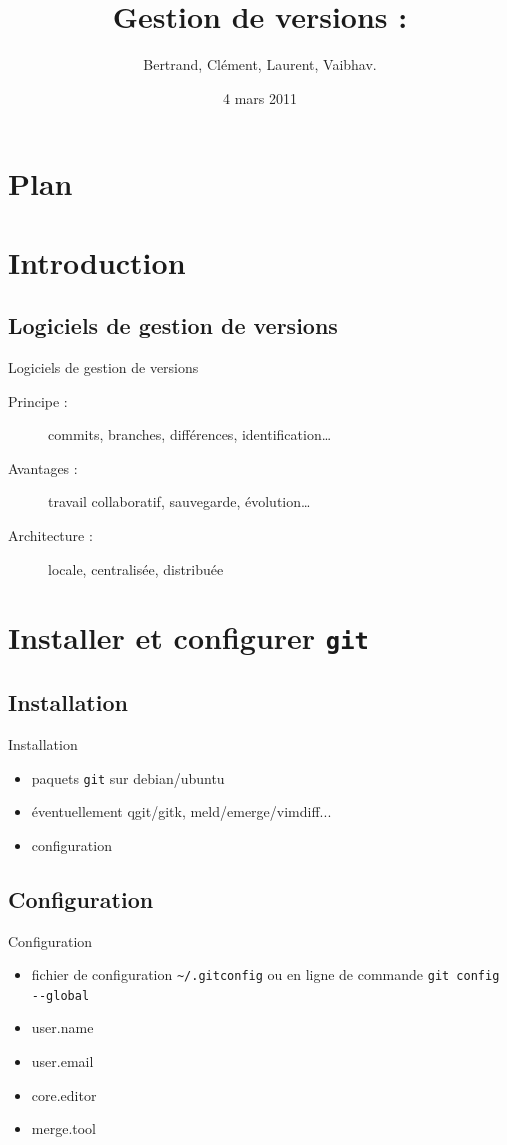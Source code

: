 \documentclass{beamer}
\title[ROSE]{Gestion de versions : \git}
\author{Bertrand, Clément, Laurent, Vaibhav.}
\institute{Télécom ParisTech}
\date{4 mars 2011}
\newcommand{\git}{\texttt{git}\xspace}
\begin{document}
\begin{frame}
  \titlepage
\end{frame}

\section*{Plan}

\section{Introduction}

\subsection*{Logiciels de gestion de versions}
\begin{frame}{Logiciels de gestion de versions}
  \begin{description}
  \item[Principe :] commits, branches, différences, identification\dots
  \item[Avantages :] travail collaboratif, sauvegarde, évolution\dots
  \item[Architecture :] locale, centralisée, distribuée
  \end{description}
\end{frame}

\section{Installer et configurer \git}

\subsection*{Installation}
\begin{frame}{Installation}
  \begin{itemize}
  \item paquets \texttt{git} sur debian/ubuntu
  \item éventuellement qgit/gitk, meld/emerge/vimdiff...
  \item configuration
  \end{itemize}
\end{frame}

\subsection*{Configuration}
\begin{frame}[containsverbatim]{Configuration}
  \begin{itemize}
  \item fichier de configuration \lstinline|~/.gitconfig| ou en ligne de commande \lstinline|git config --global|
  \item user.name
  \item user.email
  \item core.editor
  \item merge.tool
  \end{itemize}
\end{frame}
\end{document}

